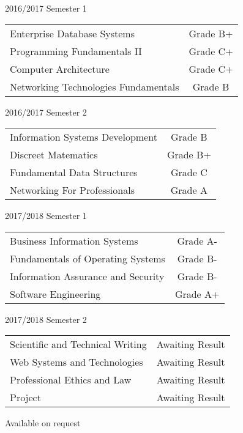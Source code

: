 \documentclass[10pt,a4paper]{altacv}
\begin{document}
\divider

2016/2017 Semester 1

\medskip
\begin{tabular}{ l c }
Enterprise Database Systems &  Grade B+\\
Programming Fundamentals II  & Grade C+\\
Computer Architecture & Grade C+\\
Networking Technologies Fundamentals & Grade B
\end{tabular}

\divider

2016/2017 Semester 2

\medskip
\begin{tabular}{ l c }
Information Systems Development &  Grade B\\
Discreet Matematics  & Grade B+\\
Fundamental Data Structures & Grade C\\
Networking For Professionals & Grade A
\end{tabular}

\divider

2017/2018 Semester 1

\medskip
\begin{tabular}{ l c }
Business Information Systems &  Grade A-\\
Fundamentals of Operating Systems & Grade B-\\
Information Assurance and Security & Grade B-\\
Software Engineering & Grade A+
\end{tabular}

\divider

2017/2018 Semester 2

\medskip
\begin{tabular}{ l c }
Scientific and Technical Writing &  Awaiting Result\\
Web Systems and Technologies & Awaiting Result\\
Professional Ethics and Law & Awaiting Result\\
Project & Awaiting Result
\end{tabular}

\divider

 Available on request
 



\end{document}

